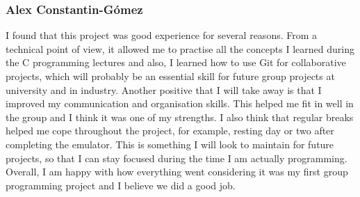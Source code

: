 \documentclass[11pt]{article}
\begin{document}
\subsubsection{Alex Constantin-G\'omez}
I found that this project was good experience for several reasons. From a technical point of view, it allowed me to practise all the concepts I learned during the C programming lectures and also, I learned how to use Git for collaborative projects, which will probably be an essential skill for future group projects at university and in industry. Another positive that I will take away is that I improved my communication and organisation skills. This helped me fit in well in the group and I think it was one of my strengths. I also think that regular breaks helped me cope throughout the project, for example, resting day or two after completing the emulator. This is something I will look to maintain for future projects, so that I can stay focused during the time I am actually programming.\\
Overall, I am happy with how everything went considering it was my first group programming project and I believe we did a good job.
\end{document}
